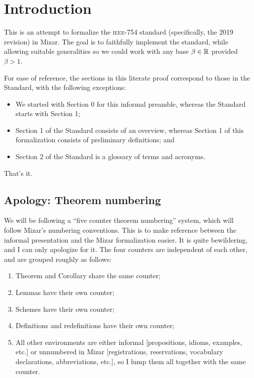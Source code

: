 \section{Introduction}

This is an attempt to formalize the \textsc{ieee}-754 standard
(specifically, the 2019 revision) in Mizar. The goal is to faithfully
implement the standard, while allowing suitable generalities so we could
work with any base $\beta\in\mathbb{R}$ provided $\beta>1$.

For ease of reference, the sections in this literate proof correspond to
those in the Standard, with the following exceptions:
\begin{itemize}
\item We started with Section 0 for this informal preamble, whereas the
  Standard starts with Section 1;
\item Section 1 of the Standard consists of an overview, whereas Section
  1 of this formalization consists of preliminary definitions; and
\item Section 2 of the Standard is a glossary of terms and acronyms.
\end{itemize}
That's it.

\subsection{Apology: Theorem numbering}
We will be following a ``five counter theorem numbering'' system, which
will follow Mizar's numbering conventions. This is to make reference
between the informal presentation and the Mizar formalization easier. It
is quite bewildering, and I can only apologize for it. The four counters
are independent of each other, and are grouped roughly as follows:
\begin{enumerate}
\item Theorem and Corollary share the same counter;
\item Lemmas have their own counter;
\item Schemes have their own counter;
\item Definitions and redefinitions have their own counter;
\item All other environments are either informal [propositions, idioms,
  examples, etc.] or unnumbered in Mizar [registrations, reservations,
  vocabulary declarations, abbreviations, etc.], so I lump them all
  together with the same counter.
\end{enumerate}

